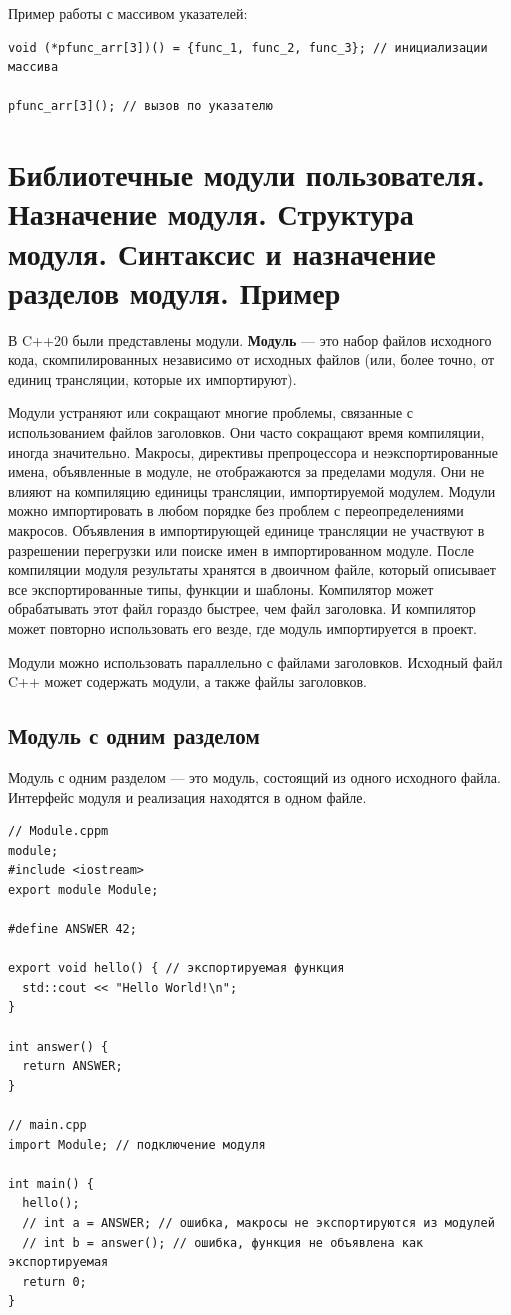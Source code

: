 Пример работы с массивом указателей:
\begin{verbatim}
void (*pfunc_arr[3])() = {func_1, func_2, func_3}; // инициализации массива

pfunc_arr[3](); // вызов по указателю
\end{verbatim}

\section{Библиотечные модули пользователя. Назначение модуля. Структура модуля. Синтаксис и назначение разделов модуля. Пример}

В C++20 были представлены модули. \textbf{Модуль} — это набор файлов исходного кода, скомпилированных независимо от исходных файлов (или, более точно, от единиц трансляции, которые их импортируют).

Модули устраняют или сокращают многие проблемы, связанные с использованием файлов заголовков. Они часто сокращают время компиляции, иногда значительно. Макросы, директивы препроцессора и неэкспортированные имена, объявленные в модуле, не отображаются за пределами модуля. Они не влияют на компиляцию единицы трансляции, импортируемой модулем. Модули можно импортировать в любом порядке без проблем с переопределениями макросов. Объявления в импортирующей единице трансляции не участвуют в разрешении перегрузки или поиске имен в импортированном модуле. После компиляции модуля результаты хранятся в двоичном файле, который описывает все экспортированные типы, функции и шаблоны. Компилятор может обрабатывать этот файл гораздо быстрее, чем файл заголовка. И компилятор может повторно использовать его везде, где модуль импортируется в проект.

Модули можно использовать параллельно с файлами заголовков. Исходный файл C++ может содержать  модули, а также  файлы заголовков.

\subsection{Модуль с одним разделом}

Модуль с одним разделом — это модуль, состоящий из одного исходного файла. Интерфейс модуля и реализация находятся в одном файле.

\begin{verbatim}
// Module.cppm
module;
#include <iostream>
export module Module;

#define ANSWER 42;

export void hello() { // экспортируемая функция
  std::cout << "Hello World!\n";
}

int answer() {
  return ANSWER; 
}

// main.cpp
import Module; // подключение модуля

int main() {
  hello();
  // int a = ANSWER; // ошибка, макросы не экспортируются из модулей
  // int b = answer(); // ошибка, функция не объявлена как экспортируемая
  return 0;
}
\end{verbatim}

